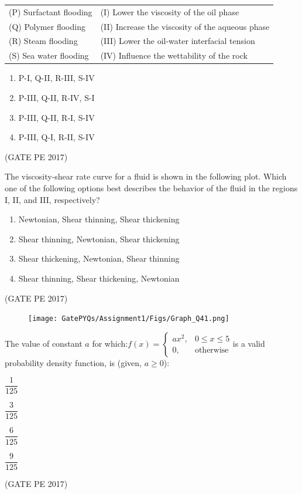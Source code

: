 \documentclass[journal,12pt,onecolumn]{IEEEtran}
\theoremstyle{remark}
\begin{document}
\begin{enumerate}
{\begin{tabular}{ll}
(P) Surfactant flooding & (I) Lower the viscosity of the oil phase \\
(Q) Polymer flooding & (II) Increase the viscosity of the aqueous phase \\
(R) Steam flooding & (III) Lower the oil-water interfacial tension \\
(S) Sea water flooding & (IV) Influence the wettability of the rock \\
\end{tabular}
\begin{enumerate}
\item P-I, Q-II, R-III, S-IV \\
\item P-III, Q-II, R-IV, S-I \\
\item P-III, Q-II, R-I, S-IV \\
\item P-III, Q-I, R-II, S-IV
\end{enumerate}
\hfill{(GATE PE 2017)}

\item The viscosity-shear rate curve for a fluid is shown in the following plot. Which one of the following options best describes the behavior of the fluid in the regions I, II, and III, respectively?

\begin{enumerate}
\item Newtonian, Shear thinning, Shear thickening
\item Shear thinning, Newtonian, Shear thickening
\item Shear thickening, Newtonian, Shear thinning
\item Shear thinning, Shear thickening, Newtonian
\end{enumerate}
\hfill{(GATE PE 2017)}
\begin{figure}[h]
    \centering
    \texttt{[image: GatePYQs/Assignment1/Figs/Graph\_Q41.png]}
\end{figure}
\item The value of constant $a$ for which:$ f(x) = \begin{cases}ax^2, & 0 \leq x \leq 5 \\0, & \text{otherwise}
\end{cases}$is a valid probability density function, is (given, $a \geq 0$):
\begin{enumerate}
\begin{multicols}{4}
\item $\dfrac{1}{125}$
\item $\dfrac{3}{125}$
\item $\dfrac{6}{125}$
\item $\dfrac{9}{125}$
\end{multicols}
\end{enumerate}
\hfill{(GATE PE 2017)}

}
\end{enumerate}
\end{document}
